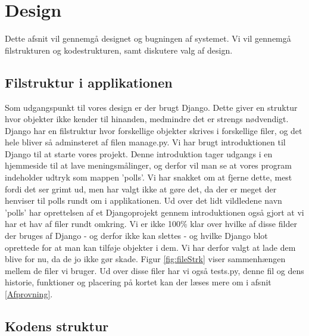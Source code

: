\documentclass[]{article}
\begin{document}
\section{Design} \label{Design}
Dette afsnit vil gennemgå designet og bugningen af systemet. Vi vil gennemgå filstrukturen og kodestrukturen, samt diskutere valg af design.
\subsection{Filstruktur i applikationen}
Som udgangspunkt til vores design er der brugt Django. Dette giver en struktur hvor objekter ikke kender til hinanden, medmindre det er strengs nødvendigt. Django har en filstruktur hvor forskellige objekter skrives i forskellige filer, og det hele bliver så adminsteret af filen manage.py. 
Vi har brugt introduktionen til Django til at starte vores projekt. Denne introduktion tager udgangs i en hjemmeside til at lave meningsmålinger, og derfor vil man se at vores program indeholder udtryk som mappen 'polls'. Vi har snakket om at fjerne dette, mest fordi det ser grimt ud, men har valgt ikke at gøre det, da der er meget der henviser til polls rundt om i applikationen. Ud over det lidt vildledene navn 'polls' har oprettelsen af et Djangoprojekt gennem introduktionen også gjort at vi har et hav af filer rundt omkring. Vi er ikke 100\% klar over hvilke af disse filder der bruges af Django - og derfor ikke kan slettes - og hvilke Django blot oprettede for at man kan tilføje objekter i dem. Vi har derfor valgt at lade dem blive for nu, da de jo ikke gør skade. Figur \ref{fig:fileStrk} viser sammenhængen mellem de filer vi bruger. Ud over disse filer har vi også tests.py, denne fil og dens historie, funktioner og placering på kortet kan der læses mere om i afsnit \ref{Afprovning}.

\subsection{Kodens struktur}
\end{document}
